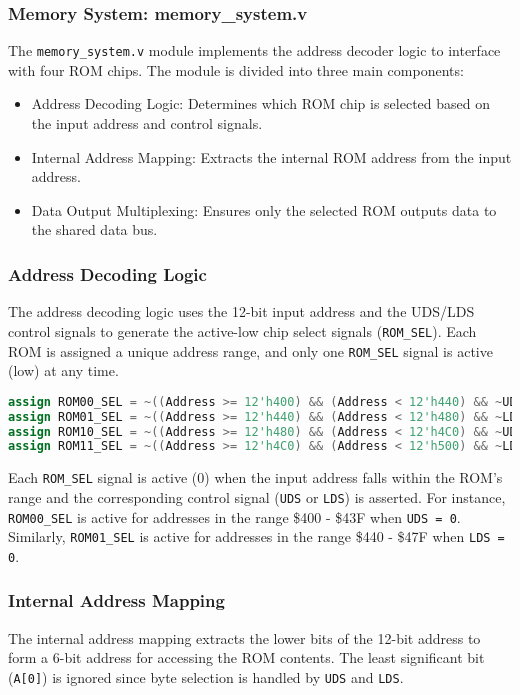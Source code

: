 \subsubsection{Memory System: memory\_system.v}
The \texttt{memory\_system.v} module implements the address decoder logic to interface with four ROM chips. The module is divided into three main components:
\begin{itemize}
    \item Address Decoding Logic: Determines which ROM chip is selected based on the input address and control signals.
    \item Internal Address Mapping: Extracts the internal ROM address from the input address.
    \item Data Output Multiplexing: Ensures only the selected ROM outputs data to the shared data bus.
\end{itemize}

\subsubsection{Address Decoding Logic}
The address decoding logic uses the 12-bit input address and the UDS/LDS control signals to generate the active-low chip select signals (\texttt{ROM\_SEL}). Each ROM is assigned a unique address range, and only one \texttt{ROM\_SEL} signal is active (low) at any time.

\begin{lstlisting}[language=Verilog, caption={Address Decoding Logic}]
assign ROM00_SEL = ~((Address >= 12'h400) && (Address < 12'h440) && ~UDS);
assign ROM01_SEL = ~((Address >= 12'h440) && (Address < 12'h480) && ~LDS);
assign ROM10_SEL = ~((Address >= 12'h480) && (Address < 12'h4C0) && ~UDS);
assign ROM11_SEL = ~((Address >= 12'h4C0) && (Address < 12'h500) && ~LDS);
\end{lstlisting}

Each \texttt{ROM\_SEL} signal is active (0) when the input address falls within the ROM's range and the corresponding control signal (\texttt{UDS} or \texttt{LDS}) is asserted. For instance, \texttt{ROM00\_SEL} is active for addresses in the range \$400 - \$43F when \texttt{UDS = 0}. Similarly, \texttt{ROM01\_SEL} is active for addresses in the range \$440 - \$47F when \texttt{LDS = 0}.

\subsubsection{Internal Address Mapping}
The internal address mapping extracts the lower bits of the 12-bit address to form a 6-bit address for accessing the ROM contents. The least significant bit (\texttt{A[0]}) is ignored since byte selection is handled by \texttt{UDS} and \texttt{LDS}.

